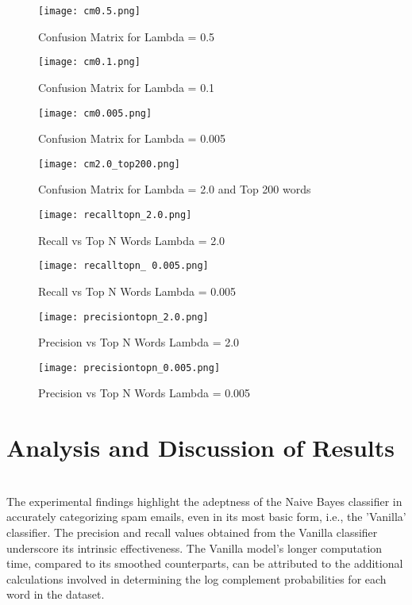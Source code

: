 \documentclass{acm_proc_article-sp}
\begin{document}
\begin{figure}[!htb]
    \centering
    \texttt{[image: cm0.5.png]}
    \caption{Confusion Matrix for Lambda = 0.5}
    \label{fig:lambda05_cm}
\end{figure}

\begin{figure}[!htb]
    \centering
    \texttt{[image: cm0.1.png]}
    \caption{Confusion Matrix for Lambda = 0.1}
    \label{fig:lambda01_cm}
\end{figure}

\begin{figure}[!htb]
    \centering
    \texttt{[image: cm0.005.png]}
    \caption{Confusion Matrix for Lambda = 0.005}
    \label{fig:lambda0005_cm}
\end{figure}

\begin{figure}[!htb]
    \centering
    \texttt{[image: cm2.0\_top200.png]}
    \caption{Confusion Matrix for Lambda = 2.0 and Top 200 words}
    \label{fig:enter-label}
\end{figure}

\begin{figure}[!htb]
    \centering
    \texttt{[image: recalltopn\_2.0.png]}
    \caption{Recall vs Top N Words Lambda = 2.0}
    \label{fig:enter-label}
\end{figure}

\begin{figure}[!htb]
    \centering
    \texttt{[image: recalltopn\_ 0.005.png]}
    \caption{Recall vs Top N Words Lambda = 0.005}
    \label{fig:enter-label}
\end{figure}

\begin{figure}[!htb]
    \centering
    \texttt{[image: precisiontopn\_2.0.png]}
    \caption{Precision vs Top N Words Lambda = 2.0}
    \label{fig:enter-label}
\end{figure}

\begin{figure}[!htb]
    \centering
    \texttt{[image: precisiontopn\_0.005.png]}
    \caption{Precision vs Top N Words Lambda = 0.005}
    \label{fig:enter-label}
\end{figure}


\section{Analysis and Discussion of Results}~\\
The experimental findings highlight the adeptness of the Naive Bayes classifier in accurately categorizing spam emails, even in its most basic form, i.e., the 'Vanilla' classifier. The precision and recall values obtained from the Vanilla classifier underscore its intrinsic effectiveness. The Vanilla model's longer computation time, compared to its smoothed counterparts, can be attributed to the additional calculations involved in determining the log complement probabilities for each word in the dataset.
\end{document}
